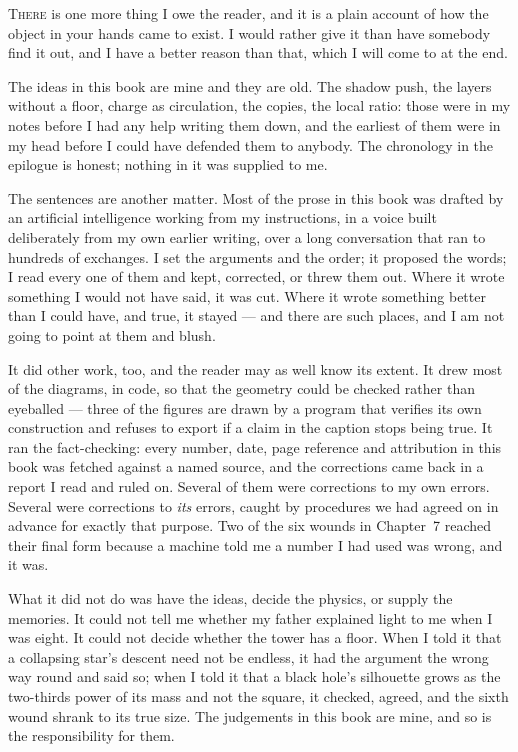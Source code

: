 
\lettrine{T}{here} is one more thing I owe the reader, and it is a plain account of how the object in your hands came to exist. I would rather give it than have somebody find it out, and I have a better reason than that, which I will come to at the end.

The ideas in this book are mine and they are old. The shadow push, the layers without a floor, charge as circulation, the copies, the local ratio: those were in my notes before I had any help writing them down, and the earliest of them were in my head before I could have defended them to anybody. The chronology in the epilogue is honest; nothing in it was supplied to me.

The sentences are another matter. Most of the prose in this book was drafted by an artificial intelligence working from my instructions, in a voice built deliberately from my own earlier writing, over a long conversation that ran to hundreds of exchanges. I set the arguments and the order; it proposed the words; I read every one of them and kept, corrected, or threw them out. Where it wrote something I would not have said, it was cut. Where it wrote something better than I could have, and true, it stayed --- and there are such places, and I am not going to point at them and blush.

It did other work, too, and the reader may as well know its extent. It drew most of the diagrams, in code, so that the geometry could be checked rather than eyeballed --- three of the figures are drawn by a program that verifies its own construction and refuses to export if a claim in the caption stops being true. It ran the fact-checking: every number, date, page reference and attribution in this book was fetched against a named source, and the corrections came back in a report I read and ruled on. Several of them were corrections to my own errors. Several were corrections to \emph{its} errors, caught by procedures we had agreed on in advance for exactly that purpose. Two of the six wounds in Chapter~7 reached their final form because a machine told me a number I had used was wrong, and it was.

What it did not do was have the ideas, decide the physics, or supply the memories. It could not tell me whether my father explained light to me when I was eight. It could not decide whether the tower has a floor. When I told it that a collapsing star's descent need not be endless, it had the argument the wrong way round and said so; when I told it that a black hole's silhouette grows as the two-thirds power of its mass and not the square, it checked, agreed, and the sixth wound shrank to its true size. The judgements in this book are mine, and so is the responsibility for them.

